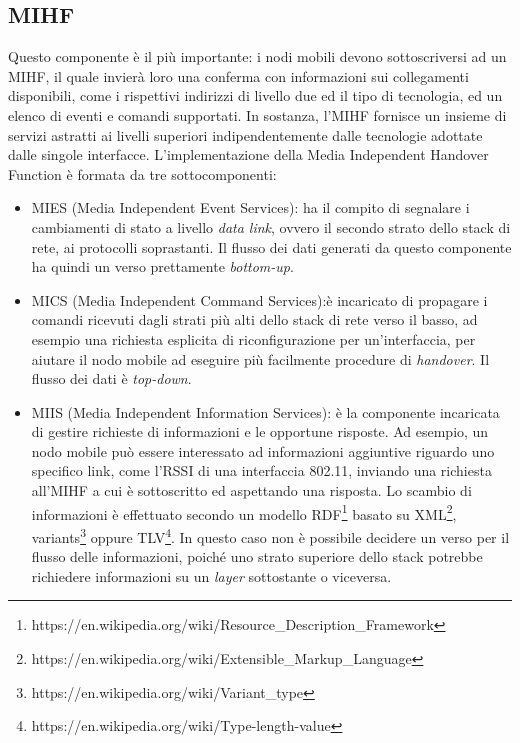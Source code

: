 \subsection{MIHF}
Questo componente è il più importante: i nodi mobili devono sottoscriversi ad un MIHF, il quale invierà loro una conferma con informazioni sui collegamenti disponibili, come i rispettivi indirizzi di livello due ed il tipo di tecnologia, ed un elenco di eventi e comandi supportati. In sostanza, l'MIHF fornisce un insieme di servizi astratti ai livelli superiori indipendentemente dalle tecnologie adottate dalle singole interfacce.
L'implementazione della Media Independent Handover Function è formata da tre sottocomponenti:
\begin{itemize}
\item MIES (Media Independent Event Services): ha il compito di segnalare i cambiamenti di stato a livello {\em data link}, ovvero il secondo strato dello stack di rete, ai protocolli soprastanti. Il flusso dei dati generati da questo componente ha quindi un verso prettamente {\em bottom-up}.
\item MICS (Media Independent Command Services):è incaricato di propagare i comandi ricevuti dagli strati più alti dello stack di rete verso il basso, ad esempio una richiesta esplicita di riconfigurazione per un'interfaccia, per aiutare il nodo mobile ad eseguire più facilmente procedure di {\em handover}. Il flusso dei dati è {\em top-down}.
\item MIIS (Media Independent Information Services): è la componente incaricata di gestire richieste di informazioni e le opportune risposte. Ad esempio, un nodo mobile può essere interessato ad informazioni aggiuntive riguardo uno specifico link, come l'RSSI di una interfaccia 802.11, inviando una richiesta all'MIHF a cui è sottoscritto ed aspettando una risposta. Lo scambio di informazioni è effettuato secondo un modello RDF\footnote{https://en.wikipedia.org/wiki/Resource\_Description\_Framework} basato su XML\footnote{https://en.wikipedia.org/wiki/Extensible\_Markup\_Language}, variants\footnote{https://en.wikipedia.org/wiki/Variant\_type} oppure TLV\footnote{https://en.wikipedia.org/wiki/Type-length-value}. In questo caso non è possibile decidere un verso per il flusso delle informazioni, poiché uno strato superiore dello stack potrebbe richiedere informazioni su un {\em layer} sottostante o viceversa.
\end{itemize}

